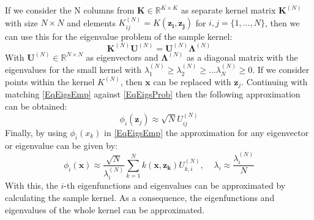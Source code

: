 If we consider the N columns from $\mathbf{K} \in \mathbb{R}^{K\times K}$ as separate kernel matrix $\mathbf{K}^{(N)}$ with size $N\times N$ and elements $K_{ij}^{(N)}=K(\mathbf{z_i,z_j})$ for $i,j=\{1,\dots,N\}$, then we can use this for the eigenvalue problem of the sample kernel:\cite{Williams.2000}
\begin{equation}\label{EqEigsProb}
	\mathbf{K}^{(N)}\mathbf{U}^{(N)} = \mathbf{U}^{(N)}\mathbf{\Lambda}^{(N)}
\end{equation} 
With $\mathbf{U}^{(N)} \in \mathbb{R}^{N\times N}$ as eigenvectors and $\boldsymbol{\Lambda}^{(N)}$ as a diagonal matrix with the eigenvalues for the small kernel with $\lambda_1^{(N)}\ge\lambda_2^{(N)}\ge\dots\lambda_N^{(N)} \ge0$.
If we consider points within the kernel $K^{(N)}$, then $\mathbf{x}$ can be replaced with $\mathbf{z}_j$.
Continuing with matching \eqref{EqEigsEmp} against \eqref{EqEigsProb} then the following approximation can be obtained:\cite{Williams.2000}
\begin{equation}\label{EqEigsFuncAprox}
	\phi_i(\mathbf{z}_j) \approx \sqrt{N}U_{ij}^{(N)}
\end{equation}
Finally, by using $\phi_i(x_k)$ in \eqref{EqEigsEmp} the approximation for any eigenvector or eigenvalue can be given by:
\begin{equation}\label{EqEigsValAprox}
	\phi_i(\mathbf{x})\approx\frac{\sqrt{N}}{\lambda_i^{(N)}}\sum_{k=1}^{N}k(\mathbf{x},\mathbf{z_k})U_{k,i}^{(N)}, \>\>\>\>\> \lambda_i \approx \frac{\lambda_i^{(N)}}{N}
\end{equation}
With this, the $i$-th eigenfunctions and eigenvalues can be approximated by calculating the sample kernel.\cite{Williams.2000}
As a consequence, the eigenfunctions and eigenvalues of the whole kernel can be approximated.
